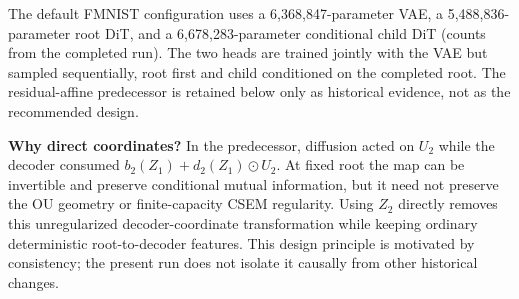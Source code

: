 \documentclass[10pt]{article}
\begin{document}
The default FMNIST configuration uses a 6,368,847-parameter VAE, a 5,488,836-parameter root DiT, and a 6,678,283-parameter conditional child DiT (counts from the completed run). The two heads are trained jointly with the VAE but sampled sequentially, root first and child conditioned on the completed root. The residual-affine predecessor is retained below only as historical evidence, not as the recommended design.

\textbf{Why direct coordinates?} In the predecessor, diffusion acted on $U_2$ while the decoder consumed $b_2(Z_1)+d_2(Z_1)\odot U_2$. At fixed root the map can be invertible and preserve conditional mutual information, but it need not preserve the OU geometry or finite-capacity CSEM regularity. Using $Z_2$ directly removes this unregularized decoder-coordinate transformation while keeping ordinary deterministic root-to-decoder features. This design principle is motivated by consistency; the present run does not isolate it causally from other historical changes.
\end{document}
